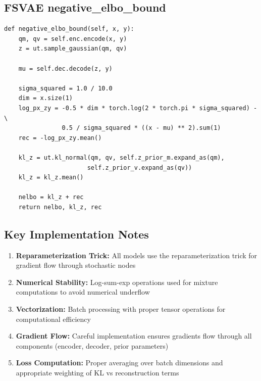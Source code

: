 \documentclass{article}
\begin{document}
\subsection{FSVAE negative_elbo_bound}

\begin{verbatim}
def negative_elbo_bound(self, x, y):
    qm, qv = self.enc.encode(x, y)
    z = ut.sample_gaussian(qm, qv)

    mu = self.dec.decode(z, y)

    sigma_squared = 1.0 / 10.0
    dim = x.size(1)
    log_px_zy = -0.5 * dim * torch.log(2 * torch.pi * sigma_squared) - \
                0.5 / sigma_squared * ((x - mu) ** 2).sum(1)
    rec = -log_px_zy.mean()

    kl_z = ut.kl_normal(qm, qv, self.z_prior_m.expand_as(qm),
                       self.z_prior_v.expand_as(qv))
    kl_z = kl_z.mean()

    nelbo = kl_z + rec
    return nelbo, kl_z, rec
\end{verbatim}

\subsection{Key Implementation Notes}

\begin{enumerate}
\item \textbf{Reparameterization Trick:} All models use the reparameterization trick for gradient flow through stochastic nodes
\item \textbf{Numerical Stability:} Log-sum-exp operations used for mixture computations to avoid numerical underflow
\item \textbf{Vectorization:} Batch processing with proper tensor operations for computational efficiency
\item \textbf{Gradient Flow:} Careful implementation ensures gradients flow through all components (encoder, decoder, prior parameters)
\item \textbf{Loss Computation:} Proper averaging over batch dimensions and appropriate weighting of KL vs reconstruction terms
\end{enumerate}
\end{document}
